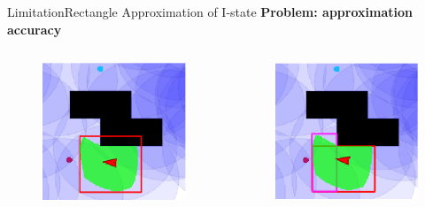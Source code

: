 \begin{frame}{Limitation}{Rectangle Approximation of I-state}
  \textbf{Problem: approximation accuracy}
   \begin{columns}
    \begin{column}{0.45\textwidth}
      \begin{figure}
        \includegraphics[width=0.5\linewidth]{figs/rect_approx}
      \end{figure}
    \end{column}
    \begin{column}{0.45\textwidth}
      \begin{figure}
        \includegraphics[width=0.5\linewidth]{figs/dbrect_approx}
      \end{figure}
    \end{column}
  \end{columns}
\end{frame}
